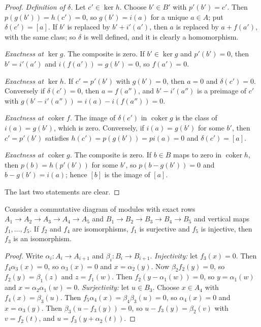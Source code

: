 \begin{proof}
\emph{Definition of $\delta$.} Let $c' \in \ker h$. Choose $b' \in B'$ with $p'(b') = c'$. Then $p(g(b')) = h(c') = 0$, so
$g(b') = i(a)$ for a unique $a \in A$; put $\delta(c') = [a]$. If $b'$ is replaced by $b' + i'(a')$, then $a$ is replaced by
$a + f(a')$, with the same class; so $\delta$ is well defined, and it is clearly a homomorphism.

\emph{Exactness at $\ker g$.} The composite is zero. If $b' \in \ker g$ and $p'(b') = 0$, then $b' = i'(a')$ and
$i(f(a')) = g(b') = 0$, so $f(a') = 0$.

\emph{Exactness at $\ker h$.} If $c' = p'(b')$ with $g(b') = 0$, then $a = 0$ and $\delta(c') = 0$. Conversely if
$\delta(c') = 0$, then $a = f(a'')$, and $b' - i'(a'')$ is a preimage of $c'$ with $g(b' - i'(a'')) = i(a) - i(f(a'')) = 0$.

\emph{Exactness at $\operatorname{coker} f$.} The image of $\delta(c')$ in $\operatorname{coker} g$ is the class of $i(a) = g(b')$, which is
zero. Conversely, if $i(a) = g(b')$ for some $b'$, then $c' = p'(b')$ satisfies $h(c') = p(g(b')) = pi(a) = 0$ and
$\delta(c') = [a]$.

\emph{Exactness at $\operatorname{coker} g$.} The composite is zero. If $b \in B$ maps to zero in $\operatorname{coker} h$, then
$p(b) = h(p'(b'))$ for some $b'$, so $p(b - g(b')) = 0$ and $b - g(b') = i(a)$; hence $[b]$ is the image of $[a]$.

The last two statements are clear.
\end{proof}

\begin{lemma}\label{homological-algebra:lemma-five}
Consider a commutative diagram of modules with exact rows
$A_1 \to A_2 \to A_3 \to A_4 \to A_5$ and $B_1 \to B_2 \to B_3 \to B_4 \to B_5$ and vertical maps $f_1, \ldots, f_5$. If $f_2$ and
$f_4$ are isomorphisms, $f_1$ is surjective and $f_5$ is injective, then $f_3$ is an isomorphism.
\end{lemma}

\begin{proof}
Write $\alpha_i \colon A_i \to A_{i+1}$ and $\beta_i \colon B_i \to B_{i+1}$. \emph{Injectivity:} let $f_3(x) = 0$. Then
$f_4\alpha_3(x) = 0$, so $\alpha_3(x) = 0$ and $x = \alpha_2(y)$. Now $\beta_2f_2(y) = 0$, so $f_2(y) = \beta_1(z)$ and
$z = f_1(w)$. Then $f_2(y - \alpha_1(w)) = 0$, so $y = \alpha_1(w)$ and $x = \alpha_2\alpha_1(w) = 0$. \emph{Surjectivity:} let
$u \in B_3$. Choose $x \in A_4$ with $f_4(x) = \beta_3(u)$. Then $f_5\alpha_4(x) = \beta_4\beta_3(u) = 0$, so $\alpha_4(x) = 0$ and
$x = \alpha_3(y)$. Then $\beta_3(u - f_3(y)) = 0$, so $u - f_3(y) = \beta_2(v)$ with $v = f_2(t)$, and
$u = f_3(y + \alpha_2(t))$.
\end{proof}

